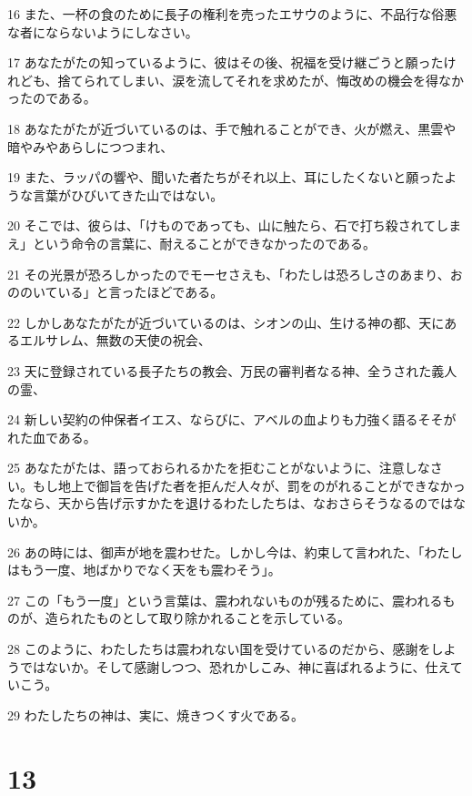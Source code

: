 \par 16 また、一杯の食のために長子の権利を売ったエサウのように、不品行な俗悪な者にならないようにしなさい。
\par 17 あなたがたの知っているように、彼はその後、祝福を受け継ごうと願ったけれども、捨てられてしまい、涙を流してそれを求めたが、悔改めの機会を得なかったのである。
\par 18 あなたがたが近づいているのは、手で触れることができ、火が燃え、黒雲や暗やみやあらしにつつまれ、
\par 19 また、ラッパの響や、聞いた者たちがそれ以上、耳にしたくないと願ったような言葉がひびいてきた山ではない。
\par 20 そこでは、彼らは、「けものであっても、山に触たら、石で打ち殺されてしまえ」という命令の言葉に、耐えることができなかったのである。
\par 21 その光景が恐ろしかったのでモーセさえも、「わたしは恐ろしさのあまり、おののいている」と言ったほどである。
\par 22 しかしあなたがたが近づいているのは、シオンの山、生ける神の都、天にあるエルサレム、無数の天使の祝会、
\par 23 天に登録されている長子たちの教会、万民の審判者なる神、全うされた義人の霊、
\par 24 新しい契約の仲保者イエス、ならびに、アベルの血よりも力強く語るそそがれた血である。
\par 25 あなたがたは、語っておられるかたを拒むことがないように、注意しなさい。もし地上で御旨を告げた者を拒んだ人々が、罰をのがれることができなかったなら、天から告げ示すかたを退けるわたしたちは、なおさらそうなるのではないか。
\par 26 あの時には、御声が地を震わせた。しかし今は、約束して言われた、「わたしはもう一度、地ばかりでなく天をも震わそう」。
\par 27 この「もう一度」という言葉は、震われないものが残るために、震われるものが、造られたものとして取り除かれることを示している。
\par 28 このように、わたしたちは震われない国を受けているのだから、感謝をしようではないか。そして感謝しつつ、恐れかしこみ、神に喜ばれるように、仕えていこう。
\par 29 わたしたちの神は、実に、焼きつくす火である。

\chapter{13}

